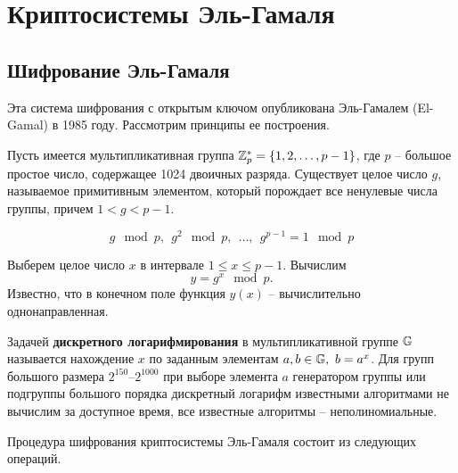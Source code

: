 \section{Криптосистемы Эль-Гамаля}

\subsection[Шифрование]{Шифрование Эль-Гамаля}

Эта система шифрования с открытым ключом опубликована Эль-Гамалем (El-Gamal) в 1985 году. Рассмотрим принципы ее построения.

Пусть имеется мультипликативная группа $\mathbb{Z}_p^* = \{1, 2, \dots, p-1\}$, где $p$ -- большое простое число, содержащее 1024 двоичных разряда. Существует целое число $g$, называемое примитивным элементом, который порождает все ненулевые числа группы, причем $1 < g < p-1$.

    \[ g\mod p, ~~ g^2\mod p, ~~ \dots, ~~ g^{p-1} = 1\mod p \]

Выберем целое число $x$ в интервале $1 \le x \le p-1$. Вычислим
    \[ y = g^x \mod p. \]
Известно, что в конечном поле функция $y(x)$ -- вычислительно однонаправленная.

Задачей \textbf{дискретного логарифмирования} в мультипликативной группе $\mathbb{G}$ называется нахождение $x$ по заданным элементам $a,b \in \mathbb{G}, ~ b = a^x$. Для групп большого размера $2^{150}$--$2^{1000}$ при выборе элемента $a$ генератором группы или подгруппы большого порядка дискретный логарифм известными алгоритмами не вычислим за доступное время, все известные алгоритмы -- неполиномиальные.

Процедура шифрования криптосистемы Эль-Гамаля состоит из следующих операций.

